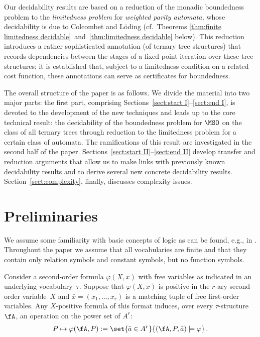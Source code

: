 \documentclass{LMCS}
\begin{document}
\noindent Our decidability results are based on a reduction of the monadic
boundedness problem to the \emph{limitedness problem} for
\emph{weighted parity automata,} whose decidability is due to
Colcombet and L\"oding \cite{ColcombetLoeding08}
(cf.~Theorems
\ref{thm:finite limitedness decidable}~and~\ref{thm:limitedness decidable}
below).
This reduction introduces a rather sophisticated annotation
(of ternary tree structures) that records dependencies between the stages
of a fixed-point iteration over these tree structures\?; it is
established that, subject to a limitedness condition on a related
cost function, these annotations can serve as certificates for boundedness.

The overall structure of the paper is as follows.
We divide the material into two major parts\?:
the first part, comprising Sections~\ref{sect:start I}--\ref{sect:end I},
is devoted to the development of the
new techniques and leads up to the core technical result\?:
the decidability of the boundedness problem for $\MSO$
on the class of all ternary trees
through reduction to the limitedness problem for a certain class of automata.
The ramifications of this result are investigated
in the second half of the paper. 
Sections~\ref{sect:start II}--\ref{sect:end II} develop
transfer and reduction arguments that allow us to make links with previously
known decidability results and to derive several new concrete
decidability results. 
Section~\ref{sect:complexity}, finally, discusses complexity issues.

\section{Preliminaries}
\label{sect:prelims}

We assume some familiarity with basic concepts of logic
as can be found, e.g., in \cite{EbbinghausFlum95}.
Throughout the paper we assume that all vocabularies are finite
and that they contain only relation symbols and constant symbols,
but no function symbols.

Consider a second-order formula $\varphi(X,\bar x)$
with free variables as indicated in an underlying vocabulary~$\tau$.
Suppose that $\varphi(X,\bar x)$ is positive in the $r$-ary
second-order variable~$X$ and $\bar x = (x_1,\dots,x_r)$ is a matching
tuple of free first-order variables.
Any $X$-positive formula of this format induces, over every
$\tau$-structure~$\fA$, an operation on the power set of $A^r$\?:
\begin{align*}
  P \mapsto \varphi(\fA,P) := \set{ \bar{a} \in A^r }{ (\fA,P,\bar{a}) \models \varphi }\,.
\end{align*}
\end{document}
